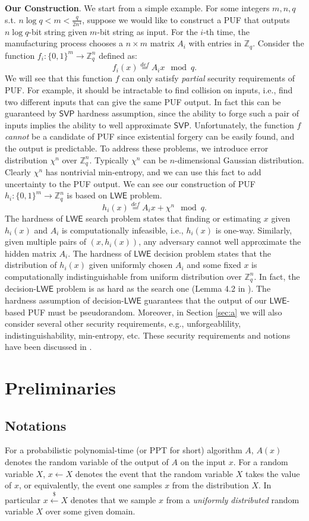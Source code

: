 \documentclass[12pt]{article}
\newcommand{\eqdef}{\stackrel{def}{=}}
\newcommand{\Z}{\mathbb{Z}}
\newcommand{\bits}{\{0,1\}}
\newcommand{\getsr}{\stackrel{\$}{\gets}}
\newcommand{\SVP}{\mathsf{SVP}}
\newcommand{\LWE}{\mathsf{LWE}}
\theoremstyle{definition}
\begin{document}
{\bf Our Construction}. We start from a simple example. For some integers $m, n, q$ s.t. $n\log q < m < \frac{q}{2n^4}$, suppose we would like to construct a PUF that outputs $n \log q$-bit string given $m$-bit string as input. For the $i$-th time, the manufacturing process chooses a $n\times m$ matrix $A_i$ with entries in $\Z_q$. Consider the function $f_i : \bits^m \to \Z_q^n$ defined as:
$$f_i(x) \eqdef A_ix \mod q.$$
We will see that this function $f$ can only satisfy \emph{partial} security requirements of PUF. For example, it should be intractable to find collision on inputs, i.e., find two different inputs that can give the same PUF output. In fact this can be guaranteed by $\SVP$ hardness assumption, since the ability to forge such a pair of inputs implies the ability to well approximate $\SVP$. Unfortunately, the function $f$ \emph{cannot} be a candidate of PUF since existential forgery can be easily found, and the output is predictable. To address these problems, we introduce error distribution $\chi^n$ over $\Z_q^n$. Typically $\chi^n$ can be $n$-dimensional Gaussian distribution. Clearly $\chi^n$ has nontrivial min-entropy, and we can use this fact to add uncertainty to the PUF output. We can see our construction of PUF $h_i : \bits^m \to \Z_q^n$ is based on $\LWE$ problem.
$$h_i(x) \eqdef A_ix + \chi^n \mod q.$$
The hardness of $\LWE$ search problem states that finding or estimating $x$ given $h_i(x)$ and $A_i$ is computationally infeasible, i.e., $h_i(x)$ is one-way. Similarly, given multiple pairs of $(x, h_i(x))$, any adversary cannot well approximate the hidden matrix $A_i$. The hardness of $\LWE$ decision problem states that the distribution of $h_i(x)$ given uniformly chosen $A_i$ and some fixed $x$ is computationally indistinguishable from uniform distribution over $\Z_q^n$. In fact, the decision-$\LWE$ problem is as hard as the search one (Lemma 4.2 in \cite{regev2009lattices}). The hardness assumption of decision-$\LWE$ guarantees that the output of our $\LWE$-based PUF must be pseudorandom. Moreover, in Section \ref{sec:a} we will also consider several other security requirements, e.g., unforgeablility, indistinguishability, min-entropy, etc. These security requirements and notions have been discussed in \cite{sadeghi2016towards}.

\section{Preliminaries}

\subsection{Notations}
For a probabilistic polynomial-time (or PPT for short) algorithm $A$, $A(x)$ denotes the random variable of the output of $A$ on the input $x$. For a random variable $X$, $x \gets X$ denotes the event that the random variable $X$ takes the value of $x$, or equivalently, the event one samples $x$ from the distribution $X$. In particular $x \getsr X$ denotes that we sample $x$ from a \emph{uniformly distributed} random variable $X$ over some given domain. 
\end{document}
